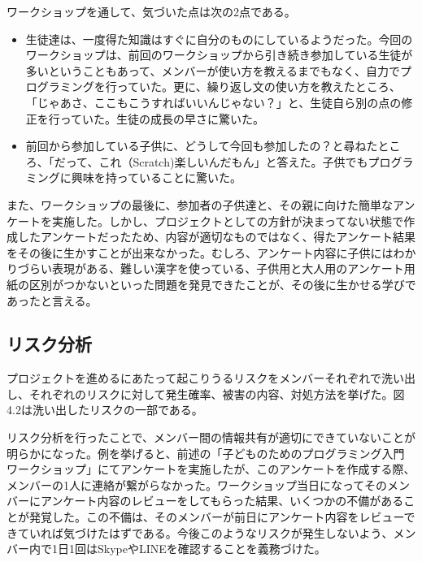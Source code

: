 \documentclass[openany,11pt,papersize]{jsbook}
\begin{document}
\par ワークショップを通して、気づいた点は次の2点である。
\begin{itemize}
\item 生徒達は、一度得た知識はすぐに自分のものにしているようだった。今回のワークショップは、前回のワークショップから引き続き参加している生徒が多いということもあって、メンバーが使い方を教えるまでもなく、自力でプログラミングを行っていた。更に、繰り返し文の使い方を教えたところ、「じゃあさ、ここもこうすればいいんじゃない？」と、生徒自ら別の点の修正を行っていた。生徒の成長の早さに驚いた。
\item 前回から参加している子供に、どうして今回も参加したの？と尋ねたところ、「だって、これ（Scratch)楽しいんだもん」と答えた。子供でもプログラミングに興味を持っていることに驚いた。
\end{itemize}

\par また、ワークショップの最後に、参加者の子供達と、その親に向けた簡単なアンケートを実施した。しかし、プロジェクトとしての方針が決まってない状態で作成したアンケートだったため、内容が適切なものではなく、得たアンケート結果をその後に生かすことが出来なかった。むしろ、アンケート内容に子供にはわかりづらい表現がある、難しい漢字を使っている、子供用と大人用のアンケート用紙の区別がつかないといった問題を発見できたことが、その後に生かせる学びであったと言える。


\subsection{リスク分析}
\par プロジェクトを進めるにあたって起こりうるリスクをメンバーそれぞれで洗い出し、それぞれのリスクに対して発生確率、被害の内容、対処方法を挙げた。図4.2は洗い出したリスクの一部である。

\par リスク分析を行ったことで、メンバー間の情報共有が適切にできていないことが明らかになった。例を挙げると、前述の「子どものためのプログラミング入門 ワークショップ」にてアンケートを実施したが、このアンケートを作成する際、メンバーの1人に連絡が繋がらなかった。ワークショップ当日になってそのメンバーにアンケート内容のレビューをしてもらった結果、いくつかの不備があることが発覚した。この不備は、そのメンバーが前日にアンケート内容をレビューできていれば気づけたはずである。今後このようなリスクが発生しないよう、メンバー内で1日1回はSkypeやLINEを確認することを義務づけた。
\end{document}
